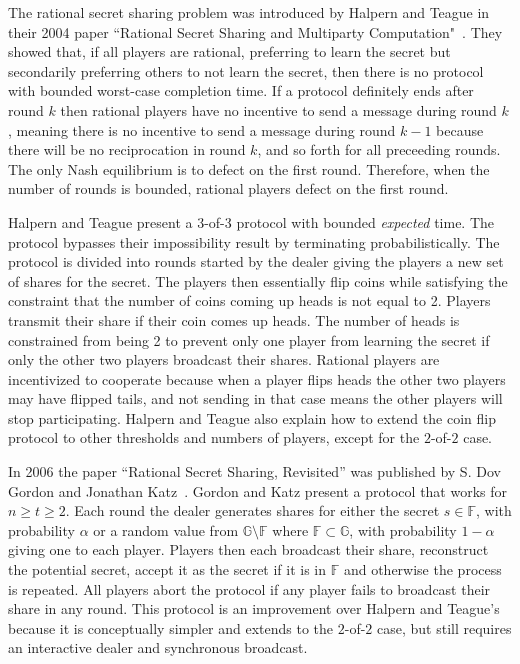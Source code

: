 \documentclass{dalcsthesis}
\begin{document}
The rational secret sharing problem was introduced by Halpern and Teague in their 2004 paper ``Rational Secret Sharing and Multiparty Computation"~\cite{halpern04}. They showed that, if all players are rational, preferring to learn the secret but secondarily preferring others to not learn the secret, then there is no protocol with bounded worst-case completion time. If a protocol definitely ends after round $k$ then rational players have no incentive to send a message during round $k$, meaning there is no incentive to send a message during round $k-1$ because there will be no reciprocation in round $k$, and so forth for all preceeding rounds. The only Nash equilibrium is to defect on the first round. Therefore, when the number of rounds is bounded, rational players defect on the first round.

Halpern and Teague present a 3-of-3 protocol with bounded \emph{expected} time. The protocol bypasses their impossibility result by terminating probabilistically. The protocol is divided into rounds started by the dealer giving the players a new set of shares for the secret. The players then essentially flip coins while satisfying the constraint that the number of coins coming up heads is not equal to 2. Players transmit their share if their coin comes up heads. The number of heads is constrained from being 2 to prevent only one player from learning the secret if only the other two players broadcast their shares. Rational players are incentivized to cooperate because when a player flips heads the other two players may have flipped tails, and not sending in that case means the other players will stop participating. Halpern and Teague also explain how to extend the coin flip protocol to other thresholds and numbers of players, except for the $2$-of-$2$ case.

In 2006 the paper ``Rational Secret Sharing, Revisited'' was published by S. Dov Gordon and Jonathan Katz~\cite{gordon06}. Gordon and Katz present a protocol that works for $n \geq t \geq 2$. Each round the dealer generates shares for either the secret $s \in \mathbb{F}$, with probability $\alpha$ or a random value from $\mathbb{G} \setminus \mathbb{F}$ where $\mathbb{F} \subset \mathbb{G}$, with probability $1-\alpha$ giving one to each player. Players then each broadcast their share, reconstruct the potential secret, accept it as the secret if it is in $\mathbb{F}$ and otherwise the process is repeated. All players abort the protocol if any player fails to broadcast their share in any round. This protocol is an improvement over Halpern and Teague's because it is conceptually simpler and extends to the $2$-of-$2$ case, but still requires an interactive dealer and synchronous broadcast. 
\end{document}
